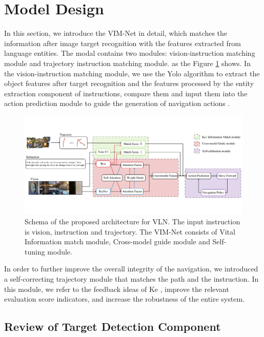 \section{Model Design}
	
In this section, we introduce the VIM-Net in detail, which matches the information after image target recognition with the features extracted from language entities. The modal contains two modules: vision-instruction matching module and trajectory instruction matching module. as the Figure \ref{image03} shows. In the vision-instruction matching module, we use the Yolo algorithm to extract the object features after target recognition and the features processed by the entity extraction component of instructions, compare them and input them into the action prediction module to guide the generation of navigation actions \cite{redmon2016you}.
\vspace{-2em}
\begin{figure}[h]
	\centering
	\includegraphics[scale=1]{image03.png}
	\caption{Schema of the proposed architecture for VLN. The input instruction is vision, instruction and trajectory. The VIM-Net consists of Vital Information match module, Cross-model guide module and Self-tuning module.}
	\label{image03}
\end{figure}

In order to further improve the overall integrity of the navigation, we introduced a self-correcting trajectory module that matches the path and the instruction. In this module, we refer to the feedback ideas of Ke \cite{ke2019tactical}, improve the relevant evaluation score indicators, and increase the robustness of the entire system.

\subsection{Review of Target Detection Component}

